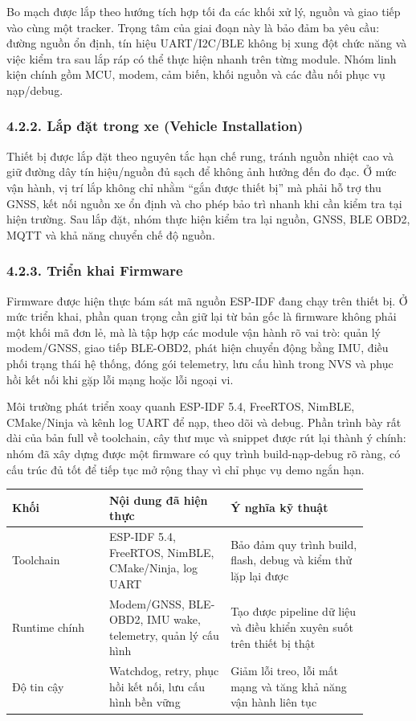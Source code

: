 \documentclass[a4paper]{extarticle}
\begin{document}
Bo mạch được lắp theo hướng tích hợp tối đa các khối xử lý, nguồn và giao tiếp vào cùng một tracker. Trọng tâm của giai đoạn này là bảo đảm ba yêu cầu: đường nguồn ổn định, tín hiệu UART/I2C/BLE không bị xung đột chức năng và việc kiểm tra sau lắp ráp có thể thực hiện nhanh trên từng module. Nhóm linh kiện chính gồm MCU, modem, cảm biến, khối nguồn và các đầu nối phục vụ nạp/debug.

\subsubsection{4.2.2. Lắp đặt trong xe (Vehicle
Installation)}\label{422-lux1eafp-ux111ux1eb7t-trong-xe-vehicle-installation}

Thiết bị được lắp đặt theo nguyên tắc hạn chế rung, tránh nguồn nhiệt cao và giữ đường dây tín hiệu/nguồn đủ sạch để không ảnh hưởng đến đo đạc. Ở mức vận hành, vị trí lắp không chỉ nhằm “gắn được thiết bị” mà phải hỗ trợ thu GNSS, kết nối nguồn xe ổn định và cho phép bảo trì nhanh khi cần kiểm tra tại hiện trường. Sau lắp đặt, nhóm thực hiện kiểm tra lại nguồn, GNSS, BLE OBD2, MQTT và khả năng chuyển chế độ nguồn.

\subsubsection{4.2.3. Triển khai Firmware}\label{423-triux1ec3n-khai-firmware}

Firmware được hiện thực bám sát mã nguồn ESP-IDF đang chạy trên thiết bị. Ở mức triển khai, phần quan trọng cần giữ lại từ bản gốc là firmware không phải một khối mã đơn lẻ, mà là tập hợp các module vận hành rõ vai trò: quản lý modem/GNSS, giao tiếp BLE-OBD2, phát hiện chuyển động bằng IMU, điều phối trạng thái hệ thống, đóng gói telemetry, lưu cấu hình trong NVS và phục hồi kết nối khi gặp lỗi mạng hoặc lỗi ngoại vi.

Môi trường phát triển xoay quanh ESP-IDF 5.4, FreeRTOS, NimBLE, CMake/Ninja và kênh log UART để nạp, theo dõi và debug. Phần trình bày rất dài của bản full về toolchain, cây thư mục và snippet được rút lại thành ý chính: nhóm đã xây dựng được một firmware có quy trình build-nạp-debug rõ ràng, có cấu trúc đủ tốt để tiếp tục mở rộng thay vì chỉ phục vụ demo ngắn hạn.

\begin{center}
\begin{tabular}{|p{0.24\linewidth}|p{0.30\linewidth}|p{0.34\linewidth}|}
\hline
\textbf{Khối} & \textbf{Nội dung đã hiện thực} & \textbf{Ý nghĩa kỹ thuật} \\
\hline
Toolchain & ESP-IDF 5.4, FreeRTOS, NimBLE, CMake/Ninja, log UART & Bảo đảm quy trình build, flash, debug và kiểm thử lặp lại được \\
\hline
Runtime chính & Modem/GNSS, BLE-OBD2, IMU wake, telemetry, quản lý cấu hình & Tạo được pipeline dữ liệu và điều khiển xuyên suốt trên thiết bị thật \\
\hline
Độ tin cậy & Watchdog, retry, phục hồi kết nối, lưu cấu hình bền vững & Giảm lỗi treo, lỗi mất mạng và tăng khả năng vận hành liên tục \\
\hline
\end{tabular}
\end{center}
\end{document}
